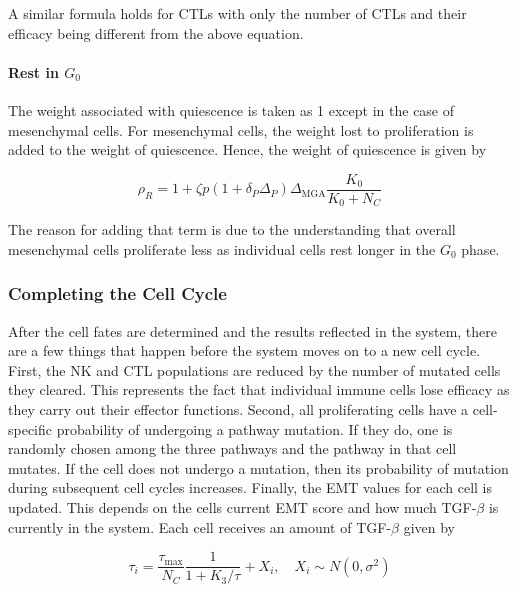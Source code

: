 \documentclass[11pt]{article}
\begin{document}
A similar formula holds for CTLs with only the number of CTLs and their efficacy being different from the above equation.


\paragraph{Rest in $G_0$} 
The weight associated with quiescence is taken as 1 except in the case of mesenchymal cells.
For mesenchymal cells, the weight lost to proliferation is added to the weight of quiescence.
Hence, the weight of quiescence is given by

\begin{equation}\tag{2.4}
\rho_R = 1 + \zeta p(1+\delta_P\Delta_P)\Delta_{\text{MGA}}\frac{K_0}{K_0+N_C}
\end{equation}

The reason for adding that term is due to the understanding that overall mesenchymal cells proliferate less as individual cells rest longer in the $G_0$ phase.

\subsubsection{Completing the Cell Cycle}
After the cell fates are determined and the results reflected in the system, there are a few things that happen before the system moves on to a new cell cycle.
First, the NK and CTL populations are reduced by the number of mutated cells they cleared.
This represents the fact that individual immune cells lose efficacy as they carry out their effector functions. 
Second, all proliferating cells have a cell-specific probability of undergoing a pathway mutation.
If they do, one is randomly chosen among the three pathways and the pathway in that cell mutates.
If the cell does not undergo a mutation, then its probability of mutation during subsequent cell cycles increases. 
Finally, the EMT values for each cell is updated.
This depends on the cells current EMT score and how much TGF-$\beta$ is currently in the system.
Each cell receives an amount of TGF-$\beta$ given by

\begin{equation}\tag{2.5}
\tau_i = \frac{\tau_{\text{max}}}{N_C}\frac{1}{1+K_3/\tau}+ X_i
, \quad X_i \sim N(0,\sigma^2)
\end{equation}
\end{document}
